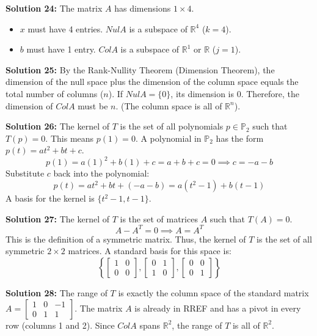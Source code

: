 \documentclass[11pt]{article}
\begin{document}
\vspace{0.3cm}
\textbf{Solution 24:} The matrix $A$ has dimensions $1 \times 4$.
\begin{itemize}
    \item $x$ must have 4 entries. $Nul A$ is a subspace of $\mathbb{R}^4$ ($k=4$).
    \item $b$ must have 1 entry. $Col A$ is a subspace of $\mathbb{R}^1$ or $\mathbb{R}$ ($j=1$).
\end{itemize}

\vspace{0.3cm}
\textbf{Solution 25:} By the Rank-Nullity Theorem (Dimension Theorem), the dimension of the null space plus the dimension of the column space equals the total number of columns ($n$). If $Nul A = \{0\}$, its dimension is 0. Therefore, the dimension of $Col A$ must be $n$. (The column space is all of $\mathbb{R}^n$).

\vspace{0.3cm}
\textbf{Solution 26:} The kernel of $T$ is the set of all polynomials $p \in \mathbb{P}_2$ such that $T(p) = 0$. This means $p(1) = 0$.
A polynomial in $\mathbb{P}_2$ has the form $p(t) = at^2 + bt + c$.
$$ p(1) = a(1)^2 + b(1) + c = a + b + c = 0 \implies c = -a - b $$
Substitute $c$ back into the polynomial:
$$ p(t) = at^2 + bt + (-a - b) = a(t^2 - 1) + b(t - 1) $$
A basis for the kernel is $\{t^2 - 1, t - 1\}$.

\vspace{0.3cm}
\textbf{Solution 27:} The kernel of $T$ is the set of matrices $A$ such that $T(A) = 0$.
$$ A - A^T = 0 \implies A = A^T $$
This is the definition of a symmetric matrix. Thus, the kernel of $T$ is the set of all symmetric $2 \times 2$ matrices. A standard basis for this space is:
$$ \left\{ \begin{bmatrix} 1 & 0 \\ 0 & 0 \end{bmatrix}, \begin{bmatrix} 0 & 1 \\ 1 & 0 \end{bmatrix}, \begin{bmatrix} 0 & 0 \\ 0 & 1 \end{bmatrix} \right\} $$

\vspace{0.3cm}
\textbf{Solution 28:} The range of $T$ is exactly the column space of the standard matrix $A = \begin{bmatrix} 1 & 0 & -1 \\ 0 & 1 & 1 \end{bmatrix}$.
The matrix $A$ is already in RREF and has a pivot in every row (columns 1 and 2). Since $Col A$ spans $\mathbb{R}^2$, the range of $T$ is all of $\mathbb{R}^2$.
\end{document}
